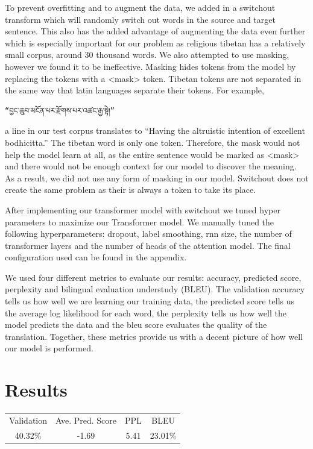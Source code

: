 \documentclass[letterpaper, 10 pt, conference]{ieeeconf}  %
\begin{document}
\par
To prevent overfitting and to augment the data, we added in a switchout transform which will randomly switch out words in the source and target sentence. This also has the added advantage of augmenting the data even further which is especially important for our problem as religious tibetan has a relatively small corpus, around 30 thousand words. We also attempted to use masking, however we found it to be ineffective. Masking hides tokens from the model by replacing the tokens with a <mask> token. Tibetan tokens are not separated in the same way that latin languages separate their tokens. For example,
\begin{verbatim}
“བྱང་ཆུབ་མངོན་པར་རྫོགས་པར་འཚང་རྒྱ་སྟེ།” 
\end{verbatim}
a line in our test corpus translates to “Having the altruistic intention of excellent bodhicitta.” The tibetan word is only one token. Therefore, the mask would not help the model learn at all, as the entire sentence would be marked as <mask> and there would not be enough context for our model to discover the meaning. As a result, we did not use any form of masking in our model. Switchout does not create the same problem as their is always a token to take its place. \par
After implementing our transformer model with switchout we tuned hyper parameters to maximize our Transformer model. We manually tuned the following hyperparameters: dropout, label smoothing, rnn size, the number of transformer layers and the number of heads of the attention model. The final configuration used can be found in the appendix. \par
We used four different metrics to evaluate our results: accuracy, predicted score, perplexity and bilingual evaluation understudy (BLEU). The validation accuracy tells us how well we are learning our training data, the predicted score tells us the average log likelihood for each word, the perplexity tells us how well the model predicts the data and the bleu score evaluates the quality of the translation. Together, these metrics provide us with a decent picture of how well our model is performed. 

\section{Results}
\begin{tabular}{ |c| c| c| c| }
 Validation & Ave. Pred. Score & PPL & BLEU \\ 
 40.32\% & -1.69 & 5.41 & 23.01\% \\

\end{tabular}\\
\end{document}
